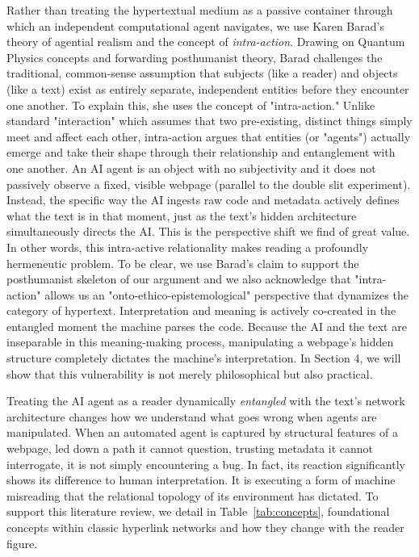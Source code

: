 \documentclass[sigconf,authordraft]{acmart}
\begin{document}
Rather than treating the hypertextual medium as a passive container through
which an independent computational agent navigates, we use Karen
Barad's~\cite{barad2007meeting} theory of agential realism and the concept of
\emph{intra-action}. Drawing on Quantum Physics concepts and forwarding posthumanist theory, Barad challenges the traditional, common-sense assumption that subjects (like a reader) and objects (like a text) exist as entirely separate, independent entities before they encounter one another. To explain this, she uses the concept of "intra-action." Unlike standard "interaction" which assumes that two pre-existing, distinct things simply meet and affect each other, intra-action argues that entities (or "agents") actually emerge and take their shape through their relationship and entanglement with one another.  An AI agent is an object  with no subjectivity and it does not passively observe a fixed, visible webpage (parallel to the double slit experiment). Instead, the specific way the AI ingests raw code and metadata actively defines what the text is in that moment, just as the text's hidden architecture simultaneously directs the AI. This is the perspective shift we find of great value. In other words, this intra-active relationality makes reading a profoundly hermeneutic problem. To be clear, we use Barad's claim to support the posthumanist skeleton of our argument and we also acknowledge that "intra-action" allows us an "onto-ethico-epistemological" perspective that dynamizes the category of hypertext. Interpretation and meaning is actively co-created in the entangled moment the machine parses the code. Because the AI and the text are inseparable in this meaning-making process, manipulating a webpage's hidden structure completely dictates the machine's interpretation. In Section 4, we will show that this vulnerability is not merely philosophical but also practical.

Treating the AI agent as a reader dynamically \textit{entangled} with the text's network
architecture changes how we understand what goes wrong when agents are
manipulated. When an automated agent is captured by structural features of a
webpage, led down a path it cannot question, trusting metadata it cannot
interrogate, it is not simply encountering a bug. In fact, its reaction significantly shows its difference to human interpretation. It is executing a form of
machine misreading that the relational topology of its environment has dictated. To support this literature review, we detail in Table~\ref{tab:concepts}, foundational concepts within classic hyperlink networks and how they change with the reader figure.
\end{document}
